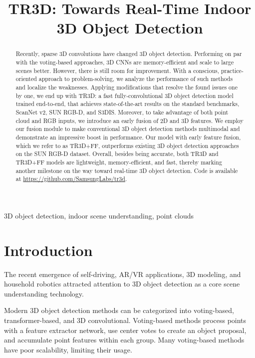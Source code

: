\documentclass{article}
\title{TR3D: Towards Real-Time Indoor 3D Object Detection}
\def\ours{TR3D}
\def\oursff{TR3D+FF}
\begin{document}
\maketitle


\begin{abstract}

Recently, sparse 3D convolutions have changed 3D object detection. Performing on par with the voting-based approaches, 3D CNNs are memory-efficient and scale to large scenes better. However, there is still room for improvement. With a conscious, practice-oriented approach to problem-solving, we analyze the performance of such methods and localize the weaknesses. Applying modifications that resolve the found issues one by one, we end up with \ours{}: a fast fully-convolutional 3D object detection model trained end-to-end, that achieves state-of-the-art results on the standard benchmarks, ScanNet v2, SUN RGB-D, and S3DIS. Moreover, to take advantage of both point cloud and RGB inputs, we introduce an early fusion of 2D and 3D features. We employ our fusion module to make conventional 3D object detection methods multimodal and demonstrate an impressive boost in performance. Our model with early feature fusion, which we refer to as \oursff, outperforms existing 3D object detection approaches on the SUN RGB-D dataset. Overall, besides being accurate, both \ours{} and \oursff{} models are lightweight, memory-efficient, and fast, thereby marking another milestone on the way toward real-time 3D object detection. Code is available at \url{https://github.com/SamsungLabs/tr3d}.

\end{abstract}
\begin{keywords}
3D object detection, indoor scene understanding, point clouds
\end{keywords}
\section{Introduction}
\label{sec:intro}



The recent emergence of self-driving, AR/VR applications, 3D modeling, and household robotics attracted attention to 3D object detection as a core scene understanding technology. 

Modern 3D object detection methods can be categorized into voting-based, transformer-based, and 3D convolutional. Voting-based methods process points with a feature extractor network, use center votes to create an object proposal, and accumulate point features within each group. Many voting-based methods have poor scalability, limiting their usage. 
\end{document}

